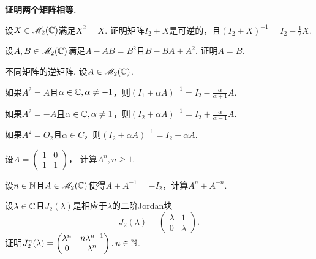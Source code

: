 \begin{mybox}
  \begin{problem}
    {\bfseries 证明两个矩阵相等.}
    \begin{enum}
      \item\label{prob1.23.a} 设$X\in\mathscr M_2(\mathbb C)$满足$X^2=X$. 证明矩阵$I_2+X$是可逆的，且$(I_2+X)^{-1}=I_2-\frac12X$.
      \item 设$A,B\in\mathscr M_2(\mathbb C)$满足$A-AB=B^2$且$B-BA+A^2$. 证明$A=B$.
    \end{enum}
  \end{problem}
\end{mybox}

\begin{problem}
  {\kaishu 不同矩阵的逆矩阵.} 设$A\in\mathscr M_2(\mathbb C)$.
  \begin{enum}
    \item 如果$A^2=A$且$\alpha\in\mathbb C,\alpha\ne-1$，则$(I_1+\alpha A)^{-1}=I_2-\frac\alpha{\alpha+1}A$.
    \item 如果$A^2=-A$且$\alpha\in\mathbb C,\alpha\ne1$，则$(I_2+\alpha A)^{-1}=I_2+\frac\alpha{\alpha-1}A$.
    \item 如果$A^2=O_2$且$\alpha\in C$，则$(I_2+\alpha A)^{-1}=I_2-\alpha A$.
  \end{enum}
\end{problem}

\begin{problem}
  设$A=\begin{pmatrix}
    1 & 0 \\
    1 & 1
  \end{pmatrix}$， 计算$A^n,n\ge1$.
\end{problem}

\begin{problem}
  设$n\in\mathbb N$且$A\in\mathscr M_2(\mathbb C)$使得$A+A^{-1}=-I_2$，计算$A^n+A^{-n}$.
\end{problem}

\begin{problem}
  设$\lambda\in\mathbb C$且$J_2(\lambda)$是相应于$\lambda$的{二阶Jordan块}
  \[
    J_2(\lambda) = \begin{pmatrix}
      \lambda & 1 \\
      0 & \lambda
    \end{pmatrix}.
  \]
  证明$J_2^n(\lambda)=\begin{pmatrix}
    \lambda^n & n\lambda^{n-1} \\
    0 & \lambda^n
  \end{pmatrix},n\in\mathbb N$.
\end{problem}

